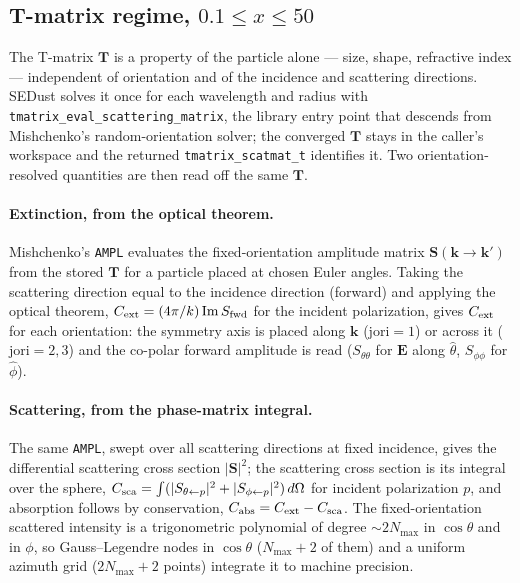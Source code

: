 \documentclass{my_memo}
\newcommand{\code}[1]{\texttt{#1}}
\begin{document}
\subsection{T-matrix regime, $0.1\le x\le 50$}

The T-matrix $\mathbf{T}$ is a property of the particle alone --- size, shape,
refractive index --- independent of orientation and of the incidence and
scattering directions. SEDust solves it once for each wavelength and radius with
\code{tmatrix\_eval\_scattering\_matrix}, the library entry point that descends
from Mishchenko's random-orientation solver; the converged $\mathbf{T}$ stays in
the caller's workspace and the returned \code{tmatrix\_scatmat\_t} identifies it.
Two orientation-resolved quantities are then read off the same $\mathbf{T}$.

\paragraph{Extinction, from the optical theorem.} Mishchenko's \code{AMPL}
evaluates the fixed-orientation amplitude matrix
$\mathbf{S}(\mathbf{k}\!\to\!\mathbf{k}')$ from the stored $\mathbf{T}$ for a
particle placed at chosen Euler angles. Taking the scattering direction equal to
the incidence direction (forward) and applying the optical theorem,
$C_{\rm ext}=(4\pi/k)\,\mathrm{Im}\,S_{\rm fwd}$ for the incident polarization,
gives $C_{\rm ext}$ for each orientation: the symmetry axis is placed along
$\mathbf{k}$ ($\mathrm{jori}=1$) or across it ($\mathrm{jori}=2,3$) and the
co-polar forward amplitude is read ($S_{\theta\theta}$ for $\mathbf{E}$ along
$\hat\theta$, $S_{\phi\phi}$ for $\hat\phi$).

\paragraph{Scattering, from the phase-matrix integral.} The same \code{AMPL},
swept over all scattering directions at fixed incidence, gives the differential
scattering cross section $|\mathbf{S}|^2$; the scattering cross section is its
integral over the sphere,
$C_{\rm sca}=\int(|S_{\theta\leftarrow p}|^2+|S_{\phi\leftarrow p}|^2)\,
d\Omega$ for incident polarization $p$, and absorption follows by conservation,
$C_{\rm abs}=C_{\rm ext}-C_{\rm sca}$. The fixed-orientation scattered intensity
is a trigonometric polynomial of degree ${\sim}2N_{\max}$ in $\cos\theta$ and in
$\phi$, so Gauss--Legendre nodes in $\cos\theta$ ($N_{\max}+2$ of them) and a
uniform azimuth grid ($2N_{\max}+2$ points) integrate it to machine precision.
\end{document}
